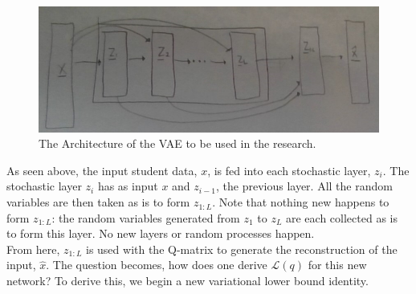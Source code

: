 \documentclass[10pt]{article}
\begin{document}
\begin{figure}[h]
	\caption{The Architecture of the VAE to be used in the research.}
	\centering
	\includegraphics[width=1.0\textwidth]{Network_Illustration}
\end{figure}
As seen above, the input student data, $x$, is fed into each stochastic layer, $z_{i}$.  The stochastic layer $z_i$ has as input $x$ and $z_{i-1}$, the previous layer.  All the random variables are then taken as is to form $z_{1:L}$.  Note that nothing new happens to form  $z_{1:L}$: the random variables generated from $z_1$ to $z_L$ are each collected as is to form this layer.  No new layers or random processes happen.  \\
From here, $z_{1:L}$ is used with the Q-matrix to generate the reconstruction of the input, $\hat{x}$.  The question becomes, how does one derive $\mathcal{L}(q)$ for this new network?  To derive this, we begin a new variational lower bound identity.
\end{document}
